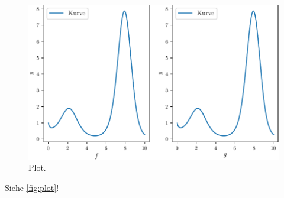 \begin{figure}
  \centering
  \includegraphics{plot.pdf}
  \caption{Plot.}
  \label{fig:plot}
\end{figure}


Siehe \autoref{fig:plot}!

